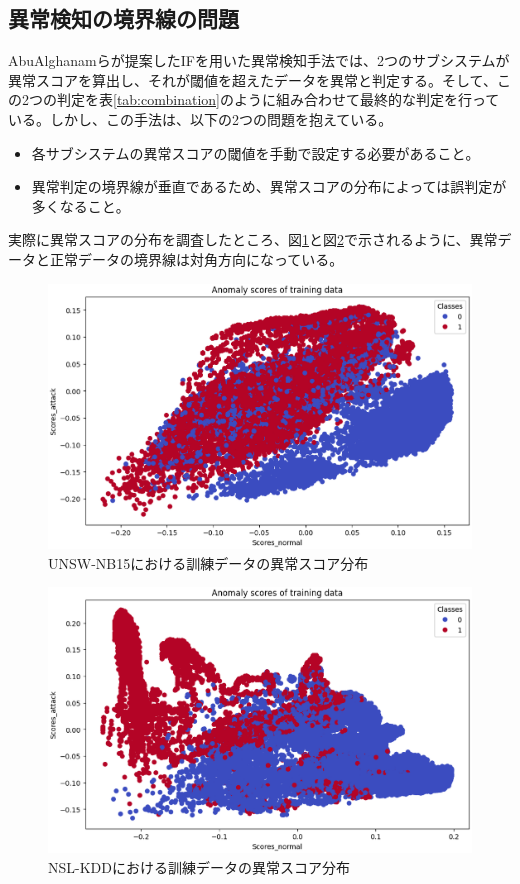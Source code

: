 \documentclass{css}
\begin{document}
\subsection{異常検知の境界線の問題}
AbuAlghanamらが提案したIFを用いた異常検知手法\cite{AbuAlghanam2023-sx}では、2つのサブシステムが異常スコアを算出し、それが閾値を超えたデータを異常と判定する。そして、この2つの判定を表\ref{tab:combination}のように組み合わせて最終的な判定を行っている。しかし、この手法は、以下の2つの問題を抱えている。

\begin{itemize}
    \item 各サブシステムの異常スコアの閾値を手動で設定する必要があること。
    \item 異常判定の境界線が垂直であるため、異常スコアの分布によっては誤判定が多くなること。
\end{itemize}

実際に異常スコアの分布を調査したところ、図\ref{fig:UNSW-NB151}と図\ref{fig:NSL-KDD1}で示されるように、異常データと正常データの境界線は対角方向になっている。

\begin{figure}[ht]
    \centering
    \includegraphics[width=\linewidth]{pictures/eps/UNSW-NB151.eps}
    \caption{UNSW-NB15における訓練データの異常スコア分布}
    \label{fig:UNSW-NB151}
\end{figure}

\begin{figure}[ht]
    \centering
    \includegraphics[width=\linewidth]{pictures/eps/NSL-KDD1.eps}
    \caption{NSL-KDDにおける訓練データの異常スコア分布}
    \label{fig:NSL-KDD1}
\end{figure}
\end{document}
